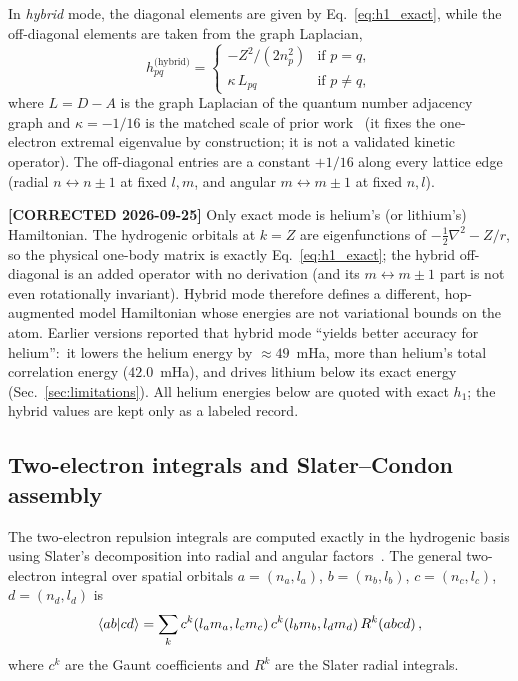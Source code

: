 \documentclass[aps,pra,twocolumn,superscriptaddress,longbibliography,floatfix]{revtex4-2}
\begin{document}
In \emph{hybrid} mode, the diagonal elements are given by
Eq.~\eqref{eq:h1_exact}, while the off-diagonal elements are
taken from the graph Laplacian,
\begin{equation}
h_{pq}^{\text{(hybrid)}} =
\begin{cases}
-Z^2/(2n_p^2) & \text{if } p = q, \\
\kappa \, L_{pq} & \text{if } p \neq q,
\end{cases}
\label{eq:h1_hybrid}
\end{equation}
where $L = D - A$ is the graph Laplacian of the quantum number
adjacency graph and $\kappa = -1/16$ is the matched scale of prior
work~\cite{Loutey2026a} (it fixes the one-electron extremal eigenvalue
by construction; it is not a validated kinetic operator).
The off-diagonal entries are a constant $+1/16$ along every lattice
edge (radial $n \leftrightarrow n\pm1$ at fixed $l,m$, and angular
$m \leftrightarrow m\pm1$ at fixed $n,l$).

\textbf{[CORRECTED 2026-09-25]} Only exact mode is helium's (or
lithium's) Hamiltonian.  The hydrogenic orbitals at $k = Z$ are
eigenfunctions of $-\tfrac12\nabla^2 - Z/r$, so the physical one-body
matrix is exactly Eq.~\eqref{eq:h1_exact}; the hybrid off-diagonal is
an added operator with no derivation (and its $m \leftrightarrow m\pm1$
part is not even rotationally invariant).  Hybrid mode therefore defines a
different, hop-augmented model Hamiltonian whose energies are not
variational bounds on the atom.  Earlier versions reported that hybrid
mode ``yields better accuracy for helium'':\ it lowers the helium energy
by $\approx 49$~mHa, more than helium's total correlation energy
($42.0$~mHa), and drives lithium below its exact energy
(Sec.~\ref{sec:limitations}).  All helium energies below are quoted
with exact $h_1$; the hybrid values are kept only as a labeled record.

\subsection{Two-electron integrals and Slater--Condon assembly}
\label{sec:two_electron}

The two-electron repulsion integrals are computed exactly in the
hydrogenic basis using Slater's decomposition into radial and angular
factors~\cite{Slater1960,Condon1935}.
The general two-electron integral over spatial orbitals
$a = (n_a, l_a)$, $b = (n_b, l_b)$, $c = (n_c, l_c)$,
$d = (n_d, l_d)$ is
\begin{equation}
\braket{ab|cd} = \sum_k c^k(l_a m_a, l_c m_c)\,
c^k(l_b m_b, l_d m_d)\, R^k(abcd)\,,
\label{eq:eri}
\end{equation}
where $c^k$ are the Gaunt coefficients and $R^k$ are the Slater
radial integrals.
\end{document}
